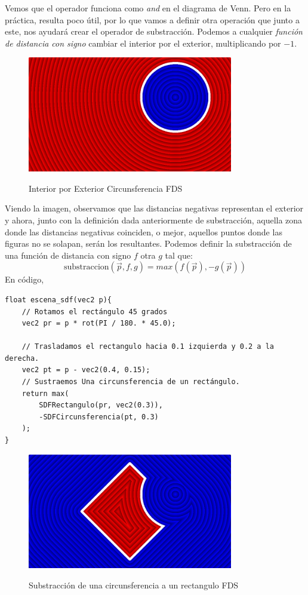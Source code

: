 Vemos que el operador funciona como \textit{and} en el diagrama de Venn. Pero en la práctica, resulta poco útil, por lo que vamos a definir otra operación que junto a este, nos ayudará crear el operador de substracción. Podemos a cualquier \textit{función de distancia con signo} cambiar el interior por el exterior, multiplicando por \(-1\).

\begin{figure}[H]
  \centering
  \captionsetup{justification=centering}%
  \includegraphics[width=0.8\textwidth]{secciones/imagenes/sdf/2d/sdf_subtract-2.png}\label{fig:negative}
  \caption{ Interior por Exterior Circunsferencia FDS}
\end{figure}

Viendo la imagen, observamos que las distancias negativas representan el exterior y ahora, junto con la definición dada anteriormente de substracción, aquella zona donde las distancias negativas coinciden, o mejor, aquellos puntos donde las figuras no se solapan, serán los resultantes. Podemos definir la substracción de una función de distancia con signo \(f\) otra \(g\) tal que:
\[\text{substraccion}(\Vec{p}, f,g)=max(f(\Vec{p}), -g(\Vec{p}))\]
En código,
\begin{lstlisting}
float escena_sdf(vec2 p){
    // Rotamos el rectángulo 45 grados
    vec2 pr = p * rot(PI / 180. * 45.0);
    
    // Trasladamos el rectangulo hacia 0.1 izquierda y 0.2 a la derecha.
    vec2 pt = p - vec2(0.4, 0.15);
    // Sustraemos Una circunsferencia de un rectángulo.
    return max(
        SDFRectangulo(pr, vec2(0.3)),
        -SDFCircunsferencia(pt, 0.3)
    );
}
\end{lstlisting}

\begin{figure}[H]
  \centering
  \captionsetup{justification=centering}%
  \includegraphics[width=0.8\textwidth]{secciones/imagenes/sdf/2d/sdf_subtract-3.png}\label{fig:substraction}
  \caption{Substracción de una circunsferencia a un rectangulo FDS}
\end{figure}

